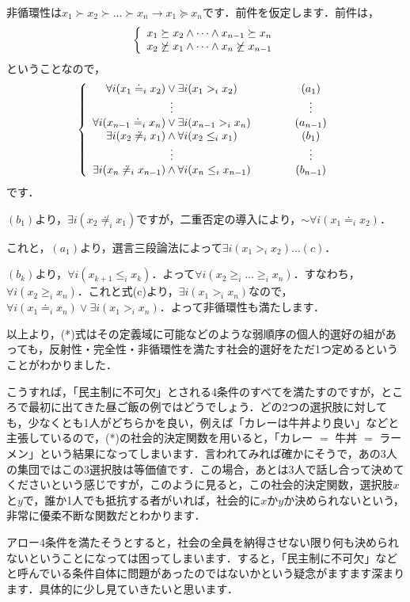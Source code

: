 非循環性は$x_1 \succ x_2 \succ \dots \succ x_n \to x_1 \succeq x_n$です．前件を仮定します．前件は，
\begin{equation*}
    \left\{
    \begin{array}[h]{l}
        x_1 \succeq x_2 \land \dots \land x_{n-1} \succeq x_n \\
        x_2 \not \succeq x_1 \land \dots \land x_n \not \succeq x_{n-1} 
    \end{array}
    \right.
\end{equation*}
ということなので，
\begin{equation*}
    \left\{
    \begin{array}[h]{clc}
        \forall i (x_1 \doteq_i x_2) \lor \exists i (x_1 >_i x_2) && (a_1)\\
        \vdots &\hspace{2em}& \vdots \\
        \forall i (x_{n-1} \doteq_i x_n) \lor \exists i (x_{n-1} >_i x_n) && (a_{n-1})\\
        \exists i (x_2 \not \doteq_i x_1) \land \forall i (x_2 \leq_i x_1) && (b_1) \\
        \vdots && \vdots \\
        \exists i (x_n \not \doteq_i x_{n-1}) \land \forall i (x_n \leq_i x_{n-1}) && (b_{n-1})
    \end{array}
    \right.
\end{equation*}
です．

$(b_1)$より，$\exists i (x_2 \not \doteq_i x_1)$ですが，二重否定の導入により，$\sim \forall i (x_1 \doteq_i x_2)$．

これと，$(a_1)$より，選言三段論法によって$\exists i (x_1 >_i x_2)\hdots (c)$．

$(b_k)$より，$\forall i (x_{k+1} \leq_i x_k)$．よって$\forall i (x_2 \geq_i \dots \geq_i x_n)$．すなわち，$\forall i (x_2 \geq_i x_n)$．これと式(c)より，$\exists i (x_1 >_i x_n)$なので，$\forall i (x_1 \doteq_i x_n) \lor \exists i (x_1 >_i x_n)$．よって非循環性も満たします．

以上より，(*)式はその定義域に可能などのような弱順序の個人的選好の組があっても，反射性・完全性・非循環性を満たす社会的選好をただ1つ定めるということがわかりました．

こうすれば，「民主制に不可欠」とされる4条件のすべてを満たすのですが，ところで最初に出てきた昼ご飯の例ではどうでしょう．どの2つの選択肢に対しても，少なくとも1人がどちらかを良い，例えば「カレーは牛丼より良い」などと主張しているので，(*)の社会的決定関数を用いると，「カレー $=$ 牛丼 $=$ ラーメン」という結果になってしまいます．言われてみれば確かにそうで，あの3人の集団ではこの3選択肢は等価値です．この場合，あとは3人で話し合って決めてくださいという感じですが，このように見ると，この社会的決定関数，選択肢$x$と$y$で，誰か1人でも抵抗する者がいれば，社会的に$x$か$y$か決められないという，非常に優柔不断な関数だとわかります．

アロー4条件を満たそうとすると，社会の全員を納得させない限り何も決められないということになっては困ってしまいます．すると，「民主制に不可欠」などと呼んでいる条件自体に問題があったのではないかという疑念がますます深まります．具体的に少し見ていきたいと思います．

